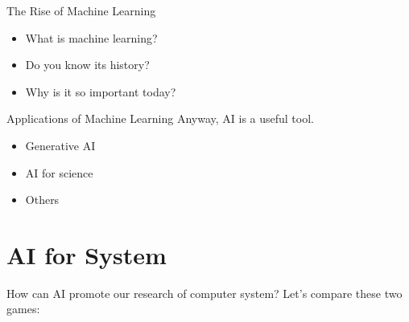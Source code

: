 \documentclass[UTF8]{beamer}
\begin{document}
\begin{frame}{The Rise of Machine Learning}
  \begin{itemize}
    \item<2-> What is machine learning?
    \item<3-> Do you know its history?
    \item<4-> Why is it so important today?
  \end{itemize}
\end{frame}

\begin{frame}{Applications of Machine Learning}
  Anyway, AI is a useful tool.
  \begin{itemize}
    \item <2-> Generative AI
    \item <3-> AI for science
    \item <4-> Others
  \end{itemize}
\end{frame}

\section{AI for System}

\begin{frame}{How can AI promote our research of computer system?}
  Let's compare these two games:
  \begin{center} 
  \end{center} 
\end{frame}
\end{document}
